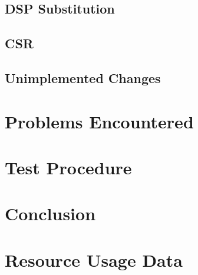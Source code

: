 \documentclass[a4paper,10pt]{article}
\begin{document}
\subsection{DSP Substitution}
\label{sec:DSP}

\subsection{CSR}
\label{sec:CSR}

\subsection{Unimplemented Changes}
\label{sec:Unimplemented_Changes}

\section{Problems Encountered}
\label{sec:Problems_Encountered}

\section{Test Procedure}
\label{sec:Test_Procedure}

\section{Conclusion}
\label{sec:Conclusion}

\newpage
\appendix
\section{Resource Usage Data}
\end{document}
